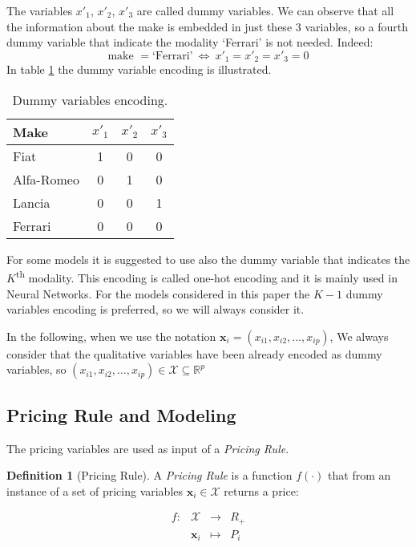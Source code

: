 \documentclass[a4paper, twoside, openright, 12pt]{report}
\theoremstyle{definition}
\newtheorem{definition}{Definition}[chapter]
\theoremstyle{definition}
\theoremstyle{definition}
\theoremstyle{remark}
\begin{document}
The variables \(x'_1\), \(x'_2\), \(x'_3\) are called dummy variables. We can observe that all the information about the make is embedded in just these 3 variables, so a fourth dummy variable that indicate the modality `Ferrari' is not needed. Indeed:
\[
\text{make } = \text{`Ferrari'} \ \Longleftrightarrow \ x'_1=x'_2=x'_3=0
\]
In table \ref{tab:dummy-variables} the dummy variable encoding is illustrated.

\begin{table}[!h]

\caption{\label{tab:dummy-variables}Dummy variables encoding.}
\centering
\begin{tabular}[t]{lccc}

\textbf{Make} & \textbf{$x'_1$} & \textbf{$x'_2$} & \textbf{$x'_3$}\\
\midrule\addlinespace
Fiat & 1 & 0 & 0\\
Alfa-Romeo & 0 & 1 & 0\\
Lancia & 0 & 0 & 1\\
Ferrari & 0 & 0 & 0\\

\end{tabular}
\end{table}

For some models it is suggested to use also the dummy variable that indicates the \(K\)\textsuperscript{th} modality. This encoding is called one-hot encoding and it is mainly used in Neural Networks. For the models considered in this paper the \(K-1\) dummy variables encoding is preferred, so we will always consider it.

In the following, when we use the notation \(\boldsymbol{x}_i=(x_{i1}, x_{i2}, \dots, x_{ip})\), We always consider that the qualitative variables have been already encoded as dummy variables, so \((x_{i1}, x_{i2}, \dots, x_{ip})\in \mathcal{X} \subseteq \mathbb{R}^p\)

\hypertarget{pricing-rule-and-modeling}{%
\subsection{Pricing Rule and Modeling}\label{pricing-rule-and-modeling}}

The pricing variables are used as input of a \emph{Pricing Rule}.

\begin{definition}[Pricing Rule]
\label{def:pricing-rule} \iffalse (Pricing Rule) \fi{} A \emph{Pricing Rule} is a function \(f(\cdot)\) that from an instance of a set of pricing variables \(\boldsymbol{x}_i\in\mathcal{X}\) returns a price:

\[  
\begin{array}{rccl}
f: & \mathcal{X}      & \longrightarrow  & R_+ \\
   & \boldsymbol{x}_i & \longmapsto      & P_i \\
\end{array}
\]
\end{definition}
\end{document}
